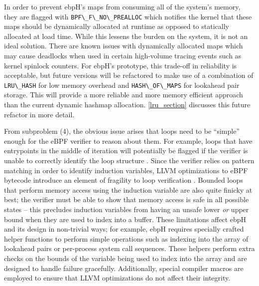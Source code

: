 \documentclass[
  12pt]{findlay}
\newcommand{\passthrough}[1]{#1}
\begin{document}
In order to prevent ebpH's maps from consuming all of the system's
memory, they are flagged with
\passthrough{\lstinline!BPF\_F\_NO\_PREALLOC!} which notifies the kernel
that these maps should be dynamically allocated at runtime as opposed to
statically allocated at load time. While this lessens the burden on the
system, it is not an ideal solution. There are known issues with
dynamically allocated maps \autocite{starovoitov16prealloc} which may
cause deadlocks when used in certain high-volume tracing events such as
kernel spinlock counters. For ebpH's prototype, this trade-off in
reliability is acceptable, but future versions will be refactored to
make use of a combination of \passthrough{\lstinline!LRU\_HASH!} for low
memory overhead and \passthrough{\lstinline!HASH\_OF\_MAPS!} for
lookahead pair storage. This will provide a more reliable and more
memory efficient approach than the current dynamic hashmap allocation.
\autoref{lru_section} discusses this future refactor in more detail.

From subproblem (4), the obvious issue arises that loops need to be
``simple'' enough for the eBPF verifier to reason about them. For
example, loops that have entrypoints in the middle of iteration will
potentially be flagged if the verifier is unable to correctly identify
the loop structure \autocite{corbet18}. Since the verifier relies on
pattern matching in order to identify induction variables, LLVM
optimizations to eBPF bytecode introduce an element of fragility to loop
verification \autocite{corbet18}. Bounded loops that perform memory
access using the induction variable are also quite finicky at best; the
verifier must be able to show that memory access is safe in all possible
states -- this precludes induction variables from having an unsafe lower
\emph{or} upper bound when they are used to index into a buffer. These
limitations affect ebpH and its design in non-trivial ways; for example,
ebpH requires specially crafted helper functions to perform simple
operations such as indexing into the array of lookahead pairs or
per-process system call sequences. These helpers perform extra checks on
the bounds of the variable being used to index into the array and are
designed to handle failure gracefully. Additionally, special compiler
macros are employed to ensure that LLVM optimizations do not affect
their integrity.
\end{document}
